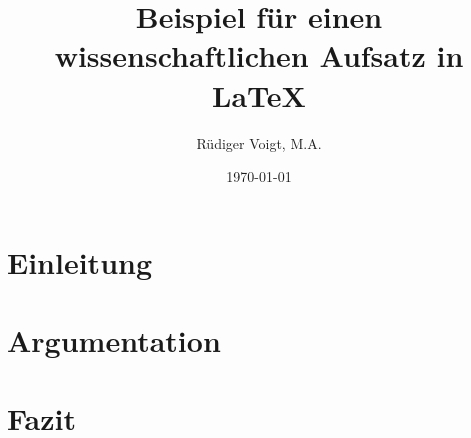 \documentclass{article}
\title{Beispiel für einen wissenschaftlichen Aufsatz in \LaTeX}
\author{Rüdiger Voigt, M.A.}
\date{\today}
\begin{document}
\maketitle

\begin{abstract}
\blindtext
\end{abstract}

\tableofcontents


\begin{multicols}{2}
\section{Einleitung}
\Blindtext
\section{Argumentation}
\blindmathtrue
\Blindtext
\section{Fazit}
\blindmathfalse
\blindtext
\end{multicols}
\end{document}
